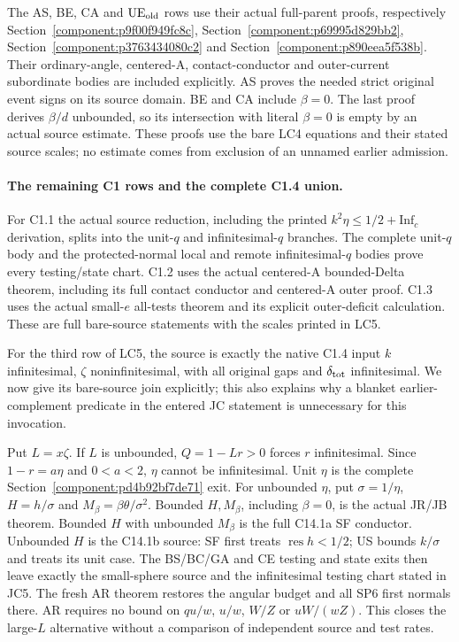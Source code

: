 The AS, BE, CA and \({\rm UE}_{\rm old}\) rows use their actual
full-parent proofs, respectively
Section~\ref{component:p9f00f949fc8c},
Section~\ref{component:p69995d829bb2},
Section~\ref{component:p3763434080c2} and
Section~\ref{component:p890eea5f538b}.
Their ordinary-angle, centered-A, contact-conductor and
outer-current subordinate bodies are included explicitly.
AS proves the needed strict original event signs on its source
domain.  BE and CA include \(\beta=0\).
The last proof derives \(\beta/d\) unbounded, so its intersection
with literal \(\beta=0\) is empty by an actual source estimate.
These proofs use the bare LC4 equations and their stated source
scales; no estimate comes from exclusion of an unnamed earlier
admission.

\paragraph{The remaining C1 rows and the complete C1.4 union.}
For C1.1 the actual source reduction, including the printed
\(k^2\eta\leq1/2+\mathrm{Inf}_c\) derivation, splits into
the unit-\(q\) and infinitesimal-\(q\) branches.  The complete
unit-\(q\) body and the protected-normal local and remote
infinitesimal-\(q\) bodies prove every testing/state chart.
C1.2 uses the actual centered-A bounded-Delta theorem, including
its full contact conductor and centered-A outer proof.
C1.3 uses the actual small-\(e\) all-tests theorem and its
explicit outer-deficit calculation.  These are full bare-source
statements with the scales printed in LC5.

For the third row of LC5, the source is exactly the native
C1.4 input \(k\) infinitesimal, \(\zeta\) noninfinitesimal,
with all original gaps and \(\delta_{\rm tot}\) infinitesimal.
We now give its bare-source join explicitly; this also explains
why a blanket earlier-complement predicate in the entered JC
statement is unnecessary for this invocation.

Put \(L=x\zeta\).  If \(L\) is unbounded, \(Q=1-Lr>0\)
forces \(r\) infinitesimal.  Since \(1-r=a\eta\) and
\(0<a<2\), \(\eta\) cannot be infinitesimal.
Unit \(\eta\) is the complete Section~\ref{component:pd4b92bf7de71}
exit.  For unbounded \(\eta\), put
\(\sigma=1/\eta\), \(H=h/\sigma\) and
\(M_\beta=\beta\theta/\sigma^2\).
Bounded \(H,M_\beta\), including \(\beta=0\), is the actual
JR/JB theorem.  Bounded \(H\) with unbounded \(M_\beta\)
is the full C14.1a SF conductor.  Unbounded \(H\) is
the C14.1b source: SF first treats \(\operatorname{res}h<1/2\);
US bounds \(k/\sigma\) and treats its unit case.
The BS/BC/GA and CE testing and state exits then leave
exactly the small-sphere source and the infinitesimal
testing chart stated in JC5.  The fresh AR theorem restores
the angular budget and all SP6 first normals there.
AR requires no bound on \(qu/w\), \(u/w\), \(W/Z\) or
\(uW/(wZ)\).  This closes the large-\(L\) alternative
without a comparison of independent source and test rates.

